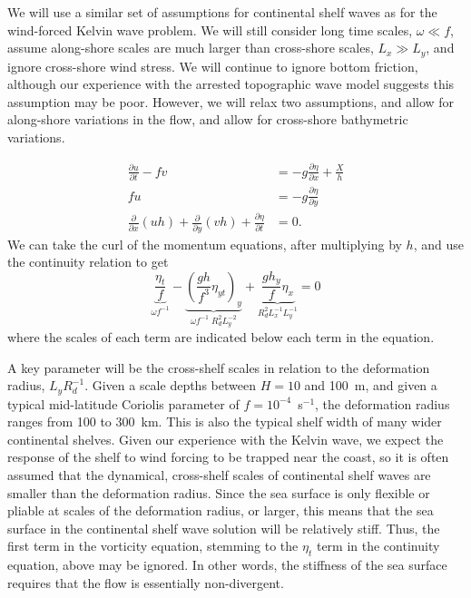 \documentclass[11pt]{report}
\numberwithin{equation}{section}
\begin{document}
We will use a similar set of assumptions for continental shelf waves as for the wind-forced Kelvin wave problem.  We will still consider long time scales, $\omega \ll f$, assume along-shore scales are much larger than cross-shore scales, $L_x \gg L_y$, and ignore cross-shore wind stress.  We will continue to ignore bottom friction, although our experience with the arrested topographic wave model suggests this assumption may be poor.  However, we will relax two assumptions, and allow for along-shore variations in the flow, and allow for cross-shore bathymetric variations.  

\begin{align}
    \frac{\partial u}{\partial t} - fv &=  - g \frac{\partial \eta}{\partial x} + \frac{X}{h} \label{eq:u-csw} \\
        f u &= -g\frac{\partial \eta}{\partial y} \label{eq:v-csw} \\
        \frac{\partial}{\partial x}(u h) + \frac{\partial}{\partial y}(v h) + \frac{\partial \eta}{\partial t} &= 0. \label{eq:cont-csw}    
\end{align}
We can take the curl of the momentum equations, after multiplying by $h$, and use the continuity relation to get
\begin{equation}
     \underbrace{ \frac{\eta_t}{f} }_{\omega f^{-1}}
        - \underbrace{ \left( \frac{g h}{f^3} \eta_{yt} \right)_y }_{ \omega f^{-1} \; R_d^2 L_y^{-2} }
        + \underbrace{ \frac{gh_y}{f}\eta_x }_{R_d^2 L_x^{-1} L_y^{-1}} = 0
\end{equation}
where the scales of each term are indicated below each term in the equation.

A key parameter will be the cross-shelf scales in relation to the deformation radius, $L_y R_d^{-1}$.  Given a scale depths between $H=10$ and 100~m, and given a typical mid-latitude Coriolis parameter of $f=10^{-4}$~s$^{-1}$, the deformation radius ranges from 100 to 300~km.  This is also the typical shelf width of many wider continental shelves.  Given our experience with the Kelvin wave, we expect the response of the shelf to wind forcing to be trapped near the coast, so it is often assumed that the dynamical, cross-shelf scales of continental shelf waves are smaller than the deformation radius.  Since the sea surface is only flexible or pliable at scales of the deformation radius, or larger, this means that the sea surface in the continental shelf wave solution will be relatively stiff.  Thus, the first term in the vorticity equation, stemming to the $\eta_t$ term in the continuity equation, above may be ignored.  In other words, the stiffness of the sea surface requires that the flow is essentially non-divergent.
\end{document}
